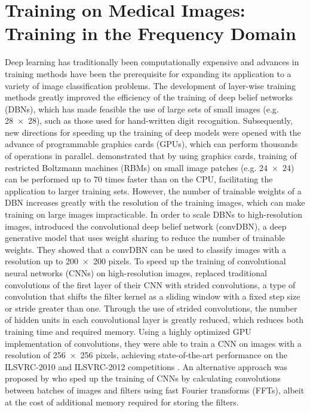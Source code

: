 \chapter{Training on Medical Images: Training in the Frequency Domain}

Deep learning has traditionally been computationally expensive and advances in
training methods have been the prerequisite for expanding its application to a
variety of image classification problems. The development of layer-wise training
methods \citep{Hinton2006b} greatly improved the efficiency of the training of
deep belief networks (DBNs), which has made feasible the use of large sets of
small images (e.g. \num{28x28}), such as those used for hand-written digit
recognition. Subsequently, new directions for speeding up the training of deep
models were opened with the advance of programmable graphics cards (GPUs), which
can perform thousands of operations in parallel.  demonstrated
that by using graphics cards, training of restricted Boltzmann machines (RBMs)
on small image patches (e.g. \num{24x24}) can be performed up to \num{70} times
faster than on the CPU, facilitating the application to larger training sets.
However, the number of trainable weights of a DBN increases greatly with the
resolution of the training images, which can make training on large images
impracticable. In order to scale DBNs to high-resolution images,
\citet{lee2009,lee2011} introduced the convolutional deep belief network
(convDBN), a deep generative model that uses weight sharing to reduce the number
of trainable weights. They showed that a convDBN can be used to classify images
with a resolution up to \num{200x200} pixels. To speed up the training of
convolutional neural networks (CNNs) on high-resolution images,
\citet{Krizhevsky2012} replaced traditional convolutions of the first layer of
their CNN with strided convolutions, a type of convolution that shifts the
filter kernel as a sliding window with a fixed step size or stride greater than
one. Through the use of strided convolutions, the number of hidden units in each
convolutional layer is greatly reduced, which reduces both training time and
required memory. Using a highly optimized GPU implementation of convolutions,
they were able to train a CNN on images with a resolution of \num{256x256}
pixels, achieving state-of-the-art performance on the ILSVRC-2010 and
ILSVRC-2012 competitions \citep{Krizhevsky2012}. An alternative approach was
proposed by \citet{Mathieu2013} who sped up the training of CNNs by calculating
convolutions between batches of images and filters using fast Fourier transforms
(FFTs), albeit at the cost of additional memory required for storing the
filters.

